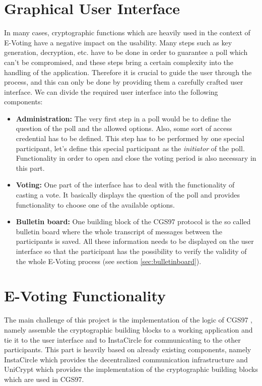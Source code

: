 \documentclass[numbers=noenddot, abstract=on, a4paper, headsepline,
footsepline, oneside, draft=off]{scrreprt}
\newcommand{\myref}[1]{(see section \vref{#1})}
\begin{document}
\section{Graphical User Interface}
\label{sec:gui}
In many cases, cryptographic functions which are heavily used in the context of
E-Voting have a negative impact on the usability. Many steps such as key
generation, decryption, etc. have to be done in order to guarantee a poll which
can't be compromised, and these steps bring a certain complexity into the
handling of the application. Therefore it is crucial to guide the user
through the process, and this can only be done by providing them a carefully
crafted user interface. We can divide the required user interface into the
following components:
\begin{itemize}
  \item \textbf{Administration:} The very first step in a poll would be to
  define the question of the poll and the allowed options. Also, some sort of
  access credential has to be defined. This step has to be performed by one
  special participant, let's define this special participant as the
  \textit{initiator} of the poll. Functionality in order to open and close the
  voting period is also necessary in this part.
  \item \textbf{Voting:} One part of the interface has to deal with the
  functionality of casting a vote. It basically displays the question of the
  poll and provides functionality to choose one of the available options.
  \item \textbf{Bulletin board:} One building block of the CGS97 protocol
  \cite{CGS97} is the so called bulletin board where the whole transcript of
  messages between the participants is saved. All these information needs to be displayed on the
  user interface so that the participant has the possibility to verify the
  validity of the whole E-Voting process \myref{sec:bulletinboard}.
\end{itemize}

\section{E-Voting Functionality}
\label{sec:evotingfunctionality}
The main challenge of this project is the implementation of the logic of CGS97 
\cite{CGS97}, namely assemble the cryptographic building blocks to a working
application and tie it to the user interface and to InstaCircle for communicating to the other
participants. This part is heavily based on already existing components, namely
InstaCircle which provides the decentralized communication infrastructure and
UniCrypt which provides the implementation of the cryptographic building blocks
which are used in CGS97.
\end{document}
